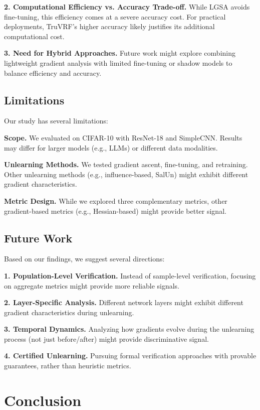 \documentclass{article}
\begin{document}
\textbf{2. Computational Efficiency vs. Accuracy Trade-off.} While LGSA avoids fine-tuning, this efficiency comes at a severe accuracy cost. For practical deployments, TruVRF's higher accuracy likely justifies its additional computational cost.

\textbf{3. Need for Hybrid Approaches.} Future work might explore combining lightweight gradient analysis with limited fine-tuning or shadow models to balance efficiency and accuracy.

\subsection{Limitations}

Our study has several limitations:

\textbf{Scope.} We evaluated on CIFAR-10 with ResNet-18 and SimpleCNN. Results may differ for larger models (e.g., LLMs) or different data modalities.

\textbf{Unlearning Methods.} We tested gradient ascent, fine-tuning, and retraining. Other unlearning methods (e.g., influence-based, SalUn) might exhibit different gradient characteristics.

\textbf{Metric Design.} While we explored three complementary metrics, other gradient-based metrics (e.g., Hessian-based) might provide better signal.

\subsection{Future Work}

Based on our findings, we suggest several directions:

\textbf{1. Population-Level Verification.} Instead of sample-level verification, focusing on aggregate metrics might provide more reliable signals.

\textbf{2. Layer-Specific Analysis.} Different network layers might exhibit different gradient characteristics during unlearning.

\textbf{3. Temporal Dynamics.} Analyzing how gradients evolve during the unlearning process (not just before/after) might provide discriminative signal.

\textbf{4. Certified Unlearning.} Pursuing formal verification approaches with provable guarantees, rather than heuristic metrics.

\section{Conclusion}
\label{sec:conclusion}
\end{document}
